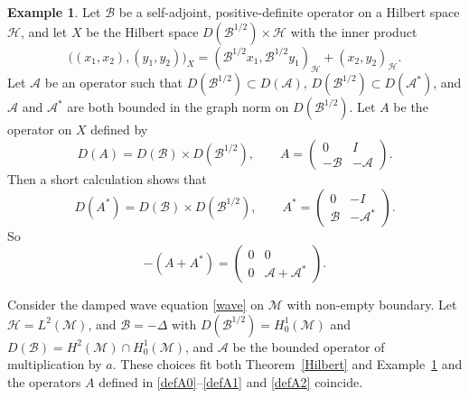 \documentclass[11pt]{amsart}
\theoremstyle{definition}
\newtheorem{example}[theorem]{Example}
\theoremstyle{remark}
\numberwithin{equation}{section}
\begin{document}
\begin{example} \label{ex64}
Let $\mathcal{B}$ be a self-adjoint, positive-definite operator on a Hilbert space $\mathcal{H}$, and let $X$ be the Hilbert space $D(\mathcal{B}^{1/2}) \times \mathcal{H}$ with the inner product
\[
\big ( (x_1,x_2), (y_1,y_2) \big)_X = (\mathcal{B}^{1/2}x_1, \mathcal{B}^{1/2}y_1 )_{\mathcal{H}} + (x_2,y_2)_{\mathcal{H}}.
\]
Let $\mathcal{A}$ be an operator such that $D(\mathcal{B}^{1/2}) \subset D(\mathcal{A})$, $D(\mathcal{B}^{1/2}) \subset D(\mathcal{A}^*)$, and $\mathcal{A}$ and $\mathcal{A}^*$ are both bounded in the graph norm on $D(\mathcal{B}^{1/2})$.  Let $A$ be the operator on $X$ defined by
\begin{equation} \label{defA2}
D(A) = D(\mathcal{B}) \times D(\mathcal{B}^{1/2}), \qquad A = \begin{pmatrix} 0 & I \\ -\mathcal{B} & - \mathcal{A} \end{pmatrix}.
\end{equation}
Then a short calculation \cite[Lemma 1, p.74]{Yak99} shows that
\[
D(A^*) = D(\mathcal{B}) \times D(\mathcal{B}^{1/2}), \qquad A^* = \begin{pmatrix} 0 & -I \\ \mathcal{B} & -\mathcal{A}^* \end{pmatrix}.
\]
So
$$
-(A + A^*) = \begin{pmatrix}  0 & 0 \\ 0 & \mathcal{A} + \mathcal{A^*} \end{pmatrix}.
$$
\end{example}

Consider the damped wave equation \eqref{wave} on $\mathcal M$ with
non-empty boundary.
Let $\mathcal{H}
= L^2(\mathcal M)$, and $\mathcal{B} = -\Delta$ with
$D(\mathcal{B}^{1/2}) = H_0^1(\mathcal M)$ and $D(\mathcal{B}) =
H^2(\mathcal M) \cap H_0^1(\mathcal M)$, and $\mathcal{A}$ be the
bounded operator of multiplication by $a$.  These choices fit both
Theorem~\ref{Hilbert} and Example~\ref{ex64} and the operators $A$
defined in \eqref{defA0}--\eqref{defA1} and \eqref{defA2} coincide.
\end{document}
